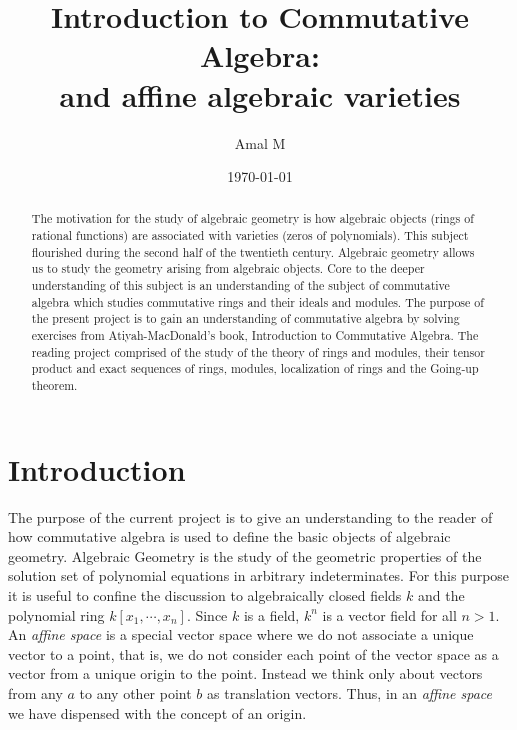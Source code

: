 \documentclass[]{report}
\begin{document}
\title{
    Introduction to Commutative Algebra: \\
    
    \large and affine algebraic varieties}
\author{Amal M}
\date{\today}
\maketitle

\begin{abstract}

    The motivation for the study of algebraic geometry is how algebraic objects (rings of rational functions) are associated with varieties (zeros of polynomials). This subject flourished during the second half of the twentieth century. Algebraic geometry allows us to study the geometry arising from algebraic objects. Core to the deeper understanding of this subject is an understanding of the subject of commutative algebra which studies commutative rings and their ideals and modules. The purpose of the present project is to gain an understanding of commutative algebra by solving exercises from Atiyah-MacDonald's book, Introduction to Commutative Algebra. The reading project comprised of the study of the theory of rings and modules, their tensor product and exact sequences of rings, modules, localization of rings and the Going-up theorem. 

\end{abstract}

\tableofcontents
\newpage

\chapter{Introduction}

The purpose of the current project is to give an understanding 
to the reader of how commutative algebra is used to define the basic
objects of algebraic geometry. Algebraic Geometry is the study of
the geometric properties of the solution set of polynomial equations
in arbitrary indeterminates. For this purpose it is useful to confine the 
discussion to algebraically closed fields $k$ and the polynomial ring
$k[x_1,\cdots,x_n]$. Since $k$ is a field, $k^n$ is a vector field for all $n>1$. An \textit{affine space} is a special vector space where we do not associate a unique vector to a point, that is, we do not consider each point of the vector space as a vector from a unique origin to the point. Instead we think only about vectors from any $a$ to any other point $b$ as translation vectors. Thus, in an \textit{affine space} we have dispensed with the concept of an origin. 
\end{document}
